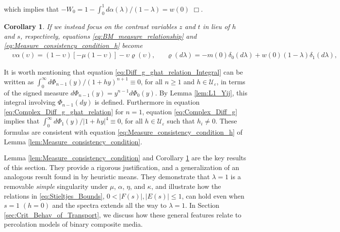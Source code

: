 \documentclass[english,12pt,jmp,graphicx]{revtex4-1}
\newtheorem{corollary}{Corollary}[section]
\begin{document}
%
which implies that $-W_0=1-\int_0^1d\alpha(\lambda)/(1-\lambda)=w(0)$ $\Box$.
%
\begin{corollary}\label{cor:Delta_functions}
%  
  If we instead focus on the contrast variables $z$ and $t$ in lieu of
  $h$ and $s$, respectively, equations
  \eqref{eq:BM_measure_relationship} and
  \eqref{eq:Measure_consistency_condition_h} become  
%
\begin{align}\label{eq:Measure_consistency_condition_z}
%  
 &\upsilon\alpha(\upsilon)=(1-\upsilon)[-\mu(1-\upsilon)] - \upsilon\varrho(\upsilon),
 &&\varrho(d\lambda)=-m(0)\delta_0(d\lambda)+w(0)(1-\lambda)\delta_1(d\lambda),
% 
\end{align}
%  
\end{corollary}
%

 It is worth mentioning 
that equation \eqref{eq:Diff_g_ghat_relation_Integral} can be written
as $\int_0^\infty d\Phi_{n-1}(y)/(1+hy)^{n+1}\equiv0$, for all $n\geq1$ and $h\in\mathcal{U}_\varepsilon$, in
terms of the signed measure $d\Phi_{n-1}(y)=y^{n-1}d\Phi_0(y)$. By Lemma
\ref{lem:L1_Yij}, this integral involving 
$\Phi_{n-1}(dy)$ is defined. Furthermore in equation
\eqref{eq:Complex_Diff_g_ghat_relation} for $n=1$, equation
\eqref{eq:Complex_Diff_g} implies that $\int_0^\infty d\Phi_1(y)/|1+hy|^4\equiv0$, for 
all $h\in\mathcal{U}_\varepsilon$ such that $h_i\neq0$. These formulas are consistent
with equation \eqref{eq:Measure_consistency_condition_h} of Lemma
\ref{lem:Measure_consistency_condition}.

Lemma \ref{lem:Measure_consistency_condition} and Corollary 
\ref{cor:Delta_functions} are the key results of this section. They
provide a rigorous justification, and a generalization of an
analogous result found in \cite{Day:JPCM-96} by heuristic means. They
demonstrate that $\lambda=1$ is a removable \emph{simple} singularity under
$\mu$, $\alpha$, $\eta$, and $\kappa$, and illustrate how the relations in
\eqref{eq:Stieltjes_Bounds}, $0<|F(s)|,|E(s)|\leq1$, can hold even when
$s=1$ $(h=0)$ and the spectra extends all the way to $\lambda=1$. In Section 
\ref{sec:Crit_Behav_of_Transport}, we discuss how these general
features relate to percolation models of binary composite media. 
       
\end{document}
